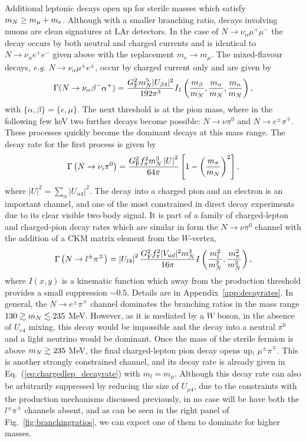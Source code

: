 \documentclass[11pt, a4paper]{article}
\newcommand{\refeq}[1]{Eq.~(\ref{#1})}
\newcommand{\reffig}[1]{Fig.~\ref{#1}}
\newcommand{\refapp}[1]{Appendix~\ref{#1}}
\def\ster{\ensuremath N}
\begin{document}
Additional leptonic decays open up for sterile masses which satisfy $m_\ster
\geq m_\mu+m_e$. Although with a smaller branching ratio, decays involving
muons are clean signatures at LAr detectors. In the case of $N\rightarrow
\nu_\alpha \mu^+ \mu^-$ the decay occurs by both neutral and charged currents
and is identical to $N\rightarrow \nu_\alpha e^+ e^-$ given above with the
replacement $m_e \rightarrow m_\mu$.  The mixed-flavour decays, \emph{e.g.}
$N\rightarrow \nu_\alpha \mu^\pm e^\pm$, occur by charged current only and are given
by 
%
\[ \Gamma(\ster\to\nu_{\alpha} \beta^- \alpha^+) = \frac{G_\text{F}^2m_\ster^5
|U_{\beta 4}|^2}{192 \pi^3} I_1\left(\frac{m_\beta}{m_N},\frac{ m_\alpha}{m_N},
\frac{ m_\alpha}{m_N} \right) , \] 
%
with $\{\alpha,\beta\} = \{e, \mu\}$. The next threshold is at the pion mass,
where in the following few keV two further decays become possible: $N\to\nu
\pi^0$ and $N\to e^\pm\pi^\mp$. These processes quickly become the dominant
decays at this mass range. 
%
The decay rate for the first process is given by
%
\[ \Gamma\left(\ster \to \nu_i \pi^0\right) =
\frac{G_\text{F}^2f_\pi^2m_\ster^3\left|U\right|^2}{64\pi} \left[1-\left(
\frac{m_\pi}{m_\ster} \right)^2\right].  \]
%
where $\left|U\right|^2 = \sum_{\alpha}\left|U_{\alpha 4}\right|^2$.
%
The decay into a charged pion and an electron is an important channel, and one
of the most constrained in direct decay experiments due to its clear visible
two-body signal.  It is part of a family of charged-lepton and charged-pion
decay rates which are similar in form the $N\to \nu \pi^0$ channel with the
addition of a CKM matrix element from the $W$-vertex,
%
\begin{align} \Gamma\left(\ster\to l^\pm\pi^\mp\right) =
\left|U_{l4}\right|^2\frac{G_\text{F}^2f_\pi^2 |V_{ud}|^2
m_\ster^3}{16\pi}I\left(\frac{m_l^2}{m_\ster^2} ,
\frac{m_\pi^2}{m_\ster^2}\right) , \label{eq:chargedlep_decayrate}\end{align}
%
where $I(x,y)$ is a kinematic function which away from the production threshold
provides a small suppression $\sim 0.5$. Details are in
\refapp{app:decayrates}.
%
In general, the $N\to e^\pm\pi^\mp$ channel dominates the branching ratios in
the mass range $130 \gtrsim m_\ster \lesssim 235$ MeV. However, as it is
mediated by a $W$ boson, in the absence of $U_{e4}$ mixing, this decay would be
impossible and the decay into a neutral $\pi^0$ and a light neutrino would be
dominant. Once the mass of the sterile fermion is above $m_\ster \gtrsim 235$
MeV, the final charged-lepton pion decay opens up, $\mu^\pm\pi^\mp$. This is
another strongly constrained channel, and its decay rate is already given in
\refeq{eq:chargedlep_decayrate} with $m_l = m_\mu$. Although this decay rate
can also be arbitrarily suppressed by reducing the size of $U_{\mu 4}$, due to
the constraints with the production mechanisms discussed previously, in no case
will be have both the $l^\pm\pi^\mp$ channels absent, and as can be seen in the
right panel of \reffig{fig:branchingratios}, we can expect one of them to
dominate for higher masses.
\end{document}
